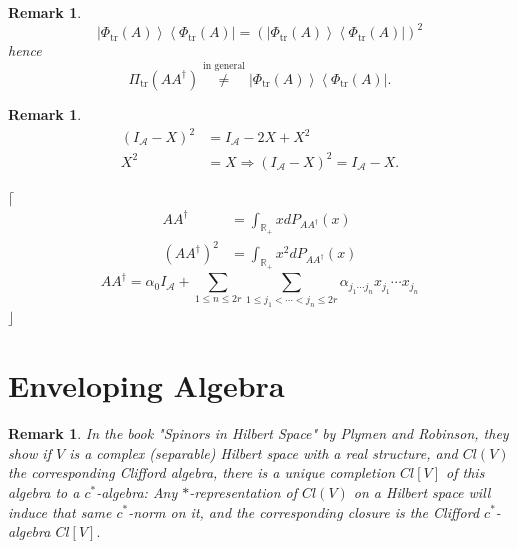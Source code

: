 \documentclass[aps,preprint]{revtex4}%
\newtheorem{remark}[theorem]{Remark}
\begin{document}
\begin{remark}%
\begin{equation}
\left\vert \Phi_{\operatorname*{tr}}\left(  A\right)  \right\rangle
\left\langle \Phi_{\operatorname*{tr}}\left(  A\right)  \right\vert =\left(
\left\vert \Phi_{\operatorname*{tr}}\left(  A\right)  \right\rangle
\left\langle \Phi_{\operatorname*{tr}}\left(  A\right)  \right\vert \right)
^{2}%
\end{equation}
hence
\begin{equation}
\Pi_{\operatorname*{tr}}\left(  AA^{\dagger}\right)  \overset{\text{in
general}}{\neq}\left\vert \Phi_{\operatorname*{tr}}\left(  A\right)
\right\rangle \left\langle \Phi_{\operatorname*{tr}}\left(  A\right)
\right\vert .
\end{equation}

\end{remark}

\begin{remark}%
\begin{align}
\left(  I_{\mathcal{A}}-X\right)  ^{2}  &  =I_{\mathcal{A}}-2X+X^{2}\\
X^{2}  &  =X\Rightarrow\left(  I_{\mathcal{A}}-X\right)  ^{2}=I_{\mathcal{A}%
}-X.
\end{align}

\end{remark}

$\lceil$%
\begin{align}
AA^{\dagger} &  =\int_{\mathbb{R}_{+}}xdP_{AA^{\dagger}}\left(  x\right)  \\
\left(  AA^{\dagger}\right)  ^{2} &  =\int_{\mathbb{R}_{+}}x^{2}%
dP_{AA^{\dagger}}\left(  x\right)
\end{align}%
\begin{equation}
AA^{\dagger}=\alpha_{0}I_{\mathcal{A}}+\sum_{1\leq n\leq2r}\sum_{1\leq
j_{1}<\cdots<j_{n}\leq2r}\alpha_{j_{1}\cdots j_{n}}x_{j_{1}}\cdots x_{j_{n}}%
\end{equation}
$\rfloor$

\appendix{}

\section{Enveloping Algebra}

\begin{remark}
In the book "Spinors in Hilbert Space" by Plymen and Robinson, they show if
$V$ is a \emph{complex (separable)} Hilbert space with a \emph{real
structure}, and $Cl(V)$ the corresponding Clifford algebra, there is a
\emph{unique completion} $Cl[V]$ of this algebra to a $c^{\ast}$-algebra: Any
$\ast$-representation of $Cl(V)$ on a Hilbert space will induce that same
$c^{\ast}$-norm on it, and the corresponding closure is the Clifford $c^{\ast
}$-algebra $Cl[V].$
\end{remark}
\end{document}
